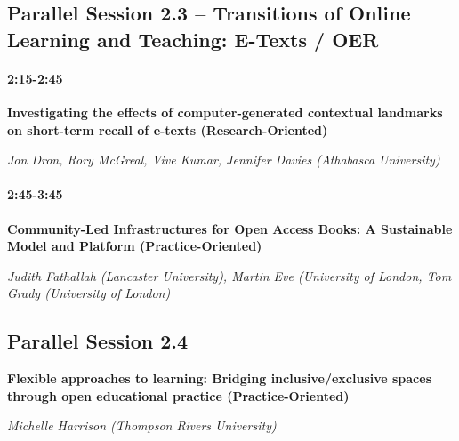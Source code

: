 \documentclass[
]{book}
\begin{document}
\hypertarget{parallel-session-2.3-transitions-of-online-learning-and-teaching-e-texts-oer}{%
\subsection*{Parallel Session 2.3 -- Transitions of Online Learning and Teaching: E-Texts / OER}\label{parallel-session-2.3-transitions-of-online-learning-and-teaching-e-texts-oer}}

\begin{secondary}
\hypertarget{section}{%
\paragraph*{2:15-2:45}\label{section}}

\textbf{Investigating the effects of computer-generated contextual
landmarks on short-term recall of e-texts (Research-Oriented)}

\emph{Jon Dron, Rory McGreal, Vive Kumar, Jennifer Davies (Athabasca
University)}
\end{secondary}

\begin{secondary}
\hypertarget{section}{%
\paragraph*{2:45-3:45}\label{section}}

\textbf{Community-Led Infrastructures for Open Access Books: A
Sustainable Model and Platform (Practice-Oriented)}

\emph{Judith Fathallah (Lancaster University), Martin Eve (University of
London, Tom Grady (University of London)}
\end{secondary}

\hypertarget{parallel-session-2.4}{%
\subsection*{Parallel Session 2.4}\label{parallel-session-2.4}}

\begin{secondary}
\textbf{Flexible approaches to learning: Bridging inclusive/exclusive
spaces through open educational practice (Practice-Oriented)}

\emph{Michelle Harrison (Thompson Rivers University)}
\end{secondary}
\end{document}
